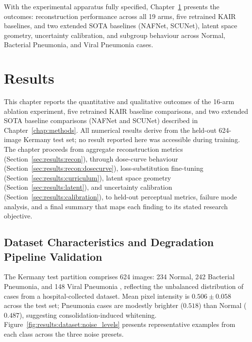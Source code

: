 \documentclass[12pt, a4paper, twoside, openright]{book}
\begin{document}
With the experimental apparatus fully specified, Chapter~\ref{chap:results} presents the outcomes: reconstruction performance across all 19 arms, five retrained KAIR baselines, and two extended SOTA baselines (NAFNet, SCUNet), latent space geometry, uncertainty calibration, and subgroup behaviour across Normal, Bacterial Pneumonia, and Viral Pneumonia cases.

\chapter{Results}
\label{chap:results}

This chapter reports the quantitative and qualitative outcomes of the 16-arm ablation experiment, five retrained KAIR baseline comparisons, and two extended SOTA baseline comparisons (NAFNet and SCUNet) described in Chapter~\ref{chap:methods}. All numerical results derive from the held-out 624-image Kermany test set; no result reported here was accessible during training. The chapter proceeds from aggregate reconstruction metrics (Section~\ref{sec:results:recon}), through dose-curve behaviour (Section~\ref{sec:results:recon:dosecurve}), loss-substitution fine-tuning (Section~\ref{sec:results:curriculum}), latent space geometry (Section~\ref{sec:results:latent}), and uncertainty calibration (Section~\ref{sec:results:calibration}), to held-out perceptual metrics, failure mode analysis, and a final summary that maps each finding to its stated research objective.


\section{Dataset Characteristics and Degradation Pipeline Validation}
\label{sec:results:dataset}

The Kermany test partition comprises 624 images: 234 Normal, 242 Bacterial Pneumonia, and 148 Viral Pneumonia \cite{kermany_identifying_2018}, reflecting the unbalanced distribution of cases from a hospital-collected dataset. Mean pixel intensity is $0.506 \pm 0.058$ across the test set; Pneumonia cases are modestly brighter ($0.518$) than Normal ($0.487$), suggesting consolidation-induced whitening. Figure~\ref{fig:results:dataset:noise_levels} presents representative examples from each class across the three noise presets.
\end{document}
